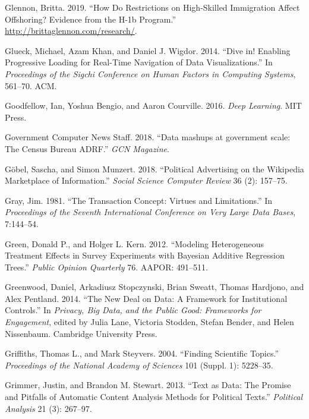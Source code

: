 \documentclass[]{krantz}
\begin{document}
\hypertarget{ref-Glennon2019}{}
Glennon, Britta. 2019. ``How Do Restrictions on High-Skilled Immigration
Affect Offshoring? Evidence from the H-1b Program.''
\url{http://brittaglennon.com/research/}.

\hypertarget{ref-glueck2014dive}{}
Glueck, Michael, Azam Khan, and Daniel J. Wigdor. 2014. ``Dive in!
Enabling Progressive Loading for Real-Time Navigation of Data
Visualizations.'' In \emph{Proceedings of the Sigchi Conference on Human
Factors in Computing Systems}, 561--70. ACM.

\hypertarget{ref-Goodfellow2016}{}
Goodfellow, Ian, Yoshua Bengio, and Aaron Courville. 2016. \emph{Deep
Learning}. MIT Press.

\hypertarget{ref-GovernmentComputerNewsStaff2018}{}
Government Computer News Staff. 2018. ``Data mashups at government
scale: The Census Bureau ADRF.'' \emph{GCN Magazine}.

\hypertarget{ref-Goebel2018}{}
Göbel, Sascha, and Simon Munzert. 2018. ``Political Advertising on the
Wikipedia Marketplace of Information.'' \emph{Social Science Computer
Review} 36 (2): 157--75.

\hypertarget{ref-gray1981transaction}{}
Gray, Jim. 1981. ``The Transaction Concept: Virtues and Limitations.''
In \emph{Proceedings of the Seventh International Conference on Very
Large Data Bases}, 7:144--54.

\hypertarget{ref-green2012modeling}{}
Green, Donald P., and Holger L. Kern. 2012. ``Modeling Heterogeneous
Treatment Effects in Survey Experiments with Bayesian Additive
Regression Trees.'' \emph{Public Opinion Quarterly} 76. AAPOR: 491--511.

\hypertarget{ref-greenwood2014}{}
Greenwood, Daniel, Arkadiusz Stopczynski, Brian Sweatt, Thomas Hardjono,
and Alex Pentland. 2014. ``The New Deal on Data: A Framework for
Institutional Controls.'' In \emph{Privacy, Big Data, and the Public
Good: Frameworks for Engagement}, edited by Julia Lane, Victoria
Stodden, Stefan Bender, and Helen Nissenbaum. Cambridge University
Press.

\hypertarget{ref-griffiths-04}{}
Griffiths, Thomas L., and Mark Steyvers. 2004. ``Finding Scientific
Topics.'' \emph{Proceedings of the National Academy of Sciences} 101
(Suppl. 1): 5228--35.

\hypertarget{ref-grimmer2013text}{}
Grimmer, Justin, and Brandon M. Stewart. 2013. ``Text as Data: The
Promise and Pitfalls of Automatic Content Analysis Methods for Political
Texts.'' \emph{Political Analysis} 21 (3): 267--97.
\end{document}
